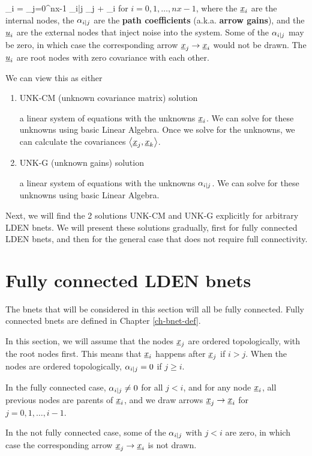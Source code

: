 \beq
\rvx_i = \sum_{j=0}^{nx-1} \alp_{i|j} 
\rvx_j + \rvu_i
\eeq
for $i=0, 1, \dots, nx-1$,
where the 
$\rvx_i$ are the internal nodes,
the $\alpha_{i|j}$
are
the {\bf path coefficients} 
(a.k.a. {\bf arrow gains}), and the
$\rvu_i$ 
are the external nodes 
that inject noise into the system.
Some of the $\alpha_{i|j}$ may
be zero,
in which case
the
corresponding arrow
$\rvx_j\rarrow \rvx_i$
would not be drawn.
The $\rvu_i$ are
root nodes with
zero covariance
with each other.

We can view this as either

\begin{enumerate}
\item UNK-CM (unknown covariance matrix) solution

a linear system 
of equations with the unknowns 
$\rvx_i$. We can solve for these
unknowns using basic Linear Algebra.
Once we solve for the unknowns,
we can calculate the covariances $\av{\rvx_j, \rvx_k}$.

\item UNK-G (unknown gains) solution

a linear system 
of equations with the
unknowns $\alpha_{i|j}$. We can solve for these
unknowns using basic Linear Algebra.

\end{enumerate}

Next, we will find the 2
solutions UNK-CM and UNK-G 
explicitly for arbitrary LDEN
bnets.
We will present these solutions 
gradually, first for fully connected 
LDEN bnets, and then for the
general case that does not require
full connectivity.

\section{Fully connected 
LDEN bnets}
The bnets that will be
considered in this section
will all be fully connected.
Fully connected
bnets are
defined in Chapter \ref{ch-bnet-def}.

In this section, we will assume that
the nodes $\rvx_j$ are ordered topologically,
with the root nodes first.
This means that $\rvx_i$ happens after
$\rvx_j$ if $i>j$.
When the nodes are ordered topologically,
$\alpha_{i|j}=0$ if $j\geq i$.

In the fully connected case, $\alpha_{i|j}\neq 0$
for all $j<i$,
and for any node $\rvx_i$, all previous nodes
are parents of $\rvx_i$, and we draw arrows  
$\rvx_j\rarrow\rvx_i$ for $j=0, 1, \ldots, i-1$.

In the not
fully connected case,
some of the $\alpha_{i|j}$ 
with $j<i$ are zero,
in which case
the
corresponding arrow
$\rvx_j\rarrow \rvx_i$
is not drawn.



